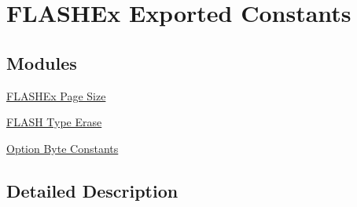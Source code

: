 \hypertarget{group___f_l_a_s_h_ex___exported___constants}{}\section{F\+L\+A\+S\+H\+Ex Exported Constants}
\label{group___f_l_a_s_h_ex___exported___constants}
\subsection*{Modules}
\begin{DoxyCompactItemize}
\item 
\hyperlink{group___f_l_a_s_h_ex___page___size}{F\+L\+A\+S\+H\+Ex Page Size}
\item 
\hyperlink{group___f_l_a_s_h_ex___type___erase}{F\+L\+A\+S\+H Type Erase}
\item 
\hyperlink{group___f_l_a_s_h_ex___option_byte___constants}{Option Byte Constants}
\end{DoxyCompactItemize}


\subsection{Detailed Description}
